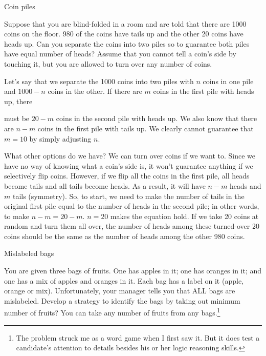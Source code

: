 \begin{problem}{Coin piles}

Suppose that you are blind-folded in a room and are told that there are 1000 coins on the
floor. 980 of the coins have tails up and the other 20 coins have heads up. Can you
separate the coins into two piles so to guarantee both piles have equal number of heads?
Assume that you cannot tell a coin's side by touching it, but you are allowed to turn over
any number of coins.
\end{problem}

\begin{solution}

Let's say that we separate the 1000 coins into two piles with $n$ coins in one pile
and $1000-n$ coins in the other. If there are $m$ coins in the first pile with heads up, there

must be $20-m$ coins in the second pile with heads up. We also know that there are
$n-m$ coins in the first pile with tails up. We clearly cannot guarantee that $m=10$ by
simply adjusting $n$.

What other options do we have? We can turn over coins if we want to. Since we have no
way of knowing what a coin's side is, it won't guarantee anything if we selectively flip
coins. However, if we flip all the coins in the first pile, all heads become tails and all
tails become heads. As a result, it will have $n-m$ heads and $m$ tails (symmetry). So, to
start, we need to make the number of tails in the original first pile equal to the number of
heads in the second pile; in other words, to make $n-m=20-m$. $n=20$ makes the
equation hold. If we take 20 coins at random and turn them all over, the number of heads
among these turned-over 20 coins should be the same as the number of heads among the
other 980 coins.

\end{solution}

\begin{problem}{Mislabeled bags}

You are given three bags of fruits. One has apples in it; one has oranges in it; and one
has a mix of apples and oranges in it. Each bag has a label on it (apple, orange or mix).
Unfortunately, your manager tells you that ALL bags are mislabeled. Develop a strategy
to identify the bags by taking out minimum number of fruits? You can take any number
of fruits from any bags.\footnote[8]{The problem struck me as a word game when I first saw it. But it does test a candidate's attention to details besides his or her logic reasoning skills.}

\end{problem}

